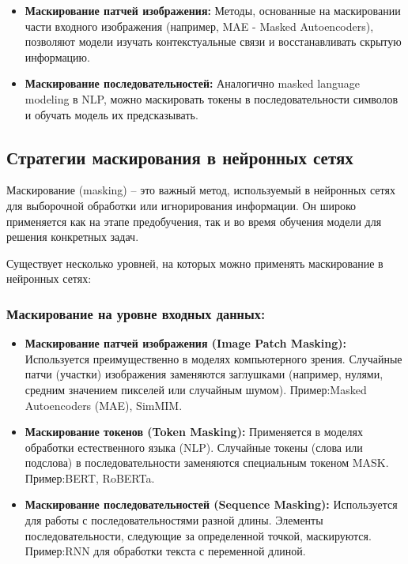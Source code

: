 \begin{itemize}
    \item \textbf{Маскирование патчей изображения:} Методы, основанные на маскировании части входного изображения (например, MAE - Masked Autoencoders), позволяют модели изучать контекстуальные связи и восстанавливать скрытую информацию.
    \item \textbf{Маскирование последовательностей:} Аналогично masked language modeling в NLP, можно маскировать токены в последовательности символов и обучать модель их предсказывать.
\end{itemize}

\subsection{Стратегии маскирования в нейронных сетях}

Маскирование (masking) -- это важный метод, используемый в нейронных сетях для выборочной обработки или игнорирования информации. Он широко применяется как на этапе предобучения, так и во время обучения модели для решения конкретных задач. 

Существует несколько уровней, на которых можно применять маскирование в нейронных сетях:

\subsubsection{Маскирование на уровне входных данных:}

\begin{itemize}
    \item \textbf{Маскирование патчей изображения (Image Patch Masking):} Используется преимущественно в моделях компьютерного зрения. Случайные патчи (участки) изображения заменяются заглушками (например, нулями, средним значением пикселей или случайным шумом). 
    Пример:Masked Autoencoders (MAE), SimMIM.
    \item \textbf{Маскирование токенов (Token Masking):} Применяется в моделях обработки естественного языка (NLP). Случайные токены (слова или подслова) в последовательности заменяются специальным токеном MASK. 
    Пример:BERT, RoBERTa.
    \item \textbf{Маскирование последовательностей (Sequence Masking):} Используется для работы с последовательностями разной длины.  Элементы последовательности, следующие за определенной точкой, маскируются. 
    Пример:RNN для обработки текста с переменной длиной.
\end{itemize}

